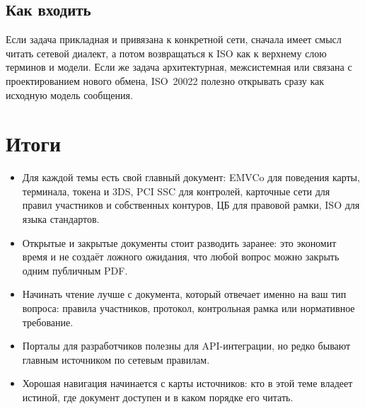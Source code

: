 \subsection*{Как входить}

Если задача прикладная и привязана к конкретной сети, сначала
имеет смысл читать сетевой диалект, а потом возвращаться к ISO
как к верхнему слою терминов и модели. Если же задача
архитектурная, межсистемная или связана с проектированием
нового обмена, ISO~20022 полезно открывать сразу
как исходную модель сообщения.

\section*{Итоги}
\begin{itemize}
  \item Для каждой темы есть свой главный документ: EMVCo для
    поведения карты, терминала, токена и 3DS, PCI SSC
    для контролей, карточные сети для правил участников
    и собственных контуров, ЦБ для правовой рамки, ISO
    для языка стандартов.
  \item Открытые и закрытые документы стоит разводить заранее:
    это экономит время и не создаёт ложного ожидания,
    что любой вопрос можно закрыть одним публичным PDF.
  \item Начинать чтение лучше с документа, который отвечает
    именно на ваш тип вопроса: правила участников, протокол,
    контрольная рамка или нормативное требование.
  \item Порталы для разработчиков полезны для API-интеграции,
    но редко бывают главным источником по сетевым правилам.
  \item Хорошая навигация начинается с карты источников:
    кто в этой теме владеет истиной, где документ доступен
    и в каком порядке его читать.
\end{itemize}
